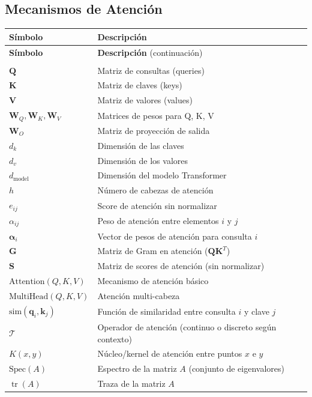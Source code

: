 \subsection*{Mecanismos de Atención}
\begin{longtable}{>{\centering\arraybackslash}p{}p{}}
\toprule
\textbf{Símbolo} & \textbf{Descripción} \\
\midrule
\endfirsthead
\toprule
\textbf{Símbolo} & \textbf{Descripción} {\small(continuación)} \\
\midrule
\endhead
\midrule
\multicolumn{2}{r}{\small\textit{Continúa en la siguiente página}} \\
\endfoot
\bottomrule
\endlastfoot
$\mathbf{Q}$ & Matriz de consultas (queries) \\
$\mathbf{K}$ & Matriz de claves (keys) \\
$\mathbf{V}$ & Matriz de valores (values) \\
$\mathbf{W}_Q, \mathbf{W}_K, \mathbf{W}_V$ & Matrices de pesos para Q, K, V \\
$\mathbf{W}_O$ & Matriz de proyección de salida \\
$d_k$ & Dimensión de las claves \\
$d_v$ & Dimensión de los valores \\
$d_{\text{model}}$ & Dimensión del modelo Transformer \\
$h$ & Número de cabezas de atención \\
$e_{ij}$ & Score de atención sin normalizar \\
$\alpha_{ij}$ & Peso de atención entre elementos $i$ y $j$ \\
$\boldsymbol{\alpha}_i$ & Vector de pesos de atención para consulta $i$ \\
$\mathbf{G}$ & Matriz de Gram en atención ($\mathbf{Q}\mathbf{K}^T$) \\
$\mathbf{S}$ & Matriz de scores de atención (sin normalizar) \\
$\text{Attention}(Q,K,V)$ & Mecanismo de atención básico \\
$\text{MultiHead}(Q,K,V)$ & Atención multi-cabeza \\
$\text{sim}(\mathbf{q}_i, \mathbf{k}_j)$ & Función de similaridad entre consulta $i$ y clave $j$ \\
$\mathcal{T}$ & Operador de atención (continuo o discreto según contexto) \\
$K(x,y)$ & Núcleo/kernel de atención entre puntos $x$ e $y$ \\
$\text{Spec}(A)$ & Espectro de la matriz $A$ (conjunto de eigenvalores) \\
$\operatorname{tr}(A)$ & Traza de la matriz $A$ \\
\end{longtable}

